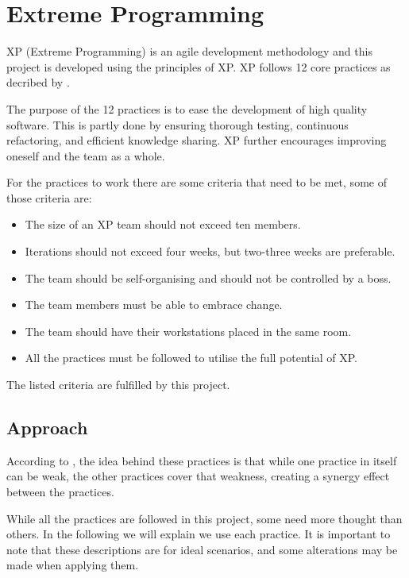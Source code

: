 \section{Extreme Programming}
XP (Extreme Programming) is an agile development methodology and this project is developed using the principles of XP. XP follows 12 core practices as decribed by \citet[p. 54]{xp:explained}.

The purpose of the 12 practices is to ease the development of high quality software. This is partly done by ensuring thorough testing, continuous refactoring, and efficient knowledge sharing. XP further encourages improving oneself and the team as a whole.

For the practices to work there are some criteria that need to be met, some of those criteria are:
\begin{itemize}
\item The size of an XP team should not exceed ten members.
\item Iterations should not exceed four weeks, but two-three weeks are preferable.
\item The team should be self-organising and should not be controlled by a boss.
\item The team members must be able to embrace change.
\item The team should have their workstations placed in the same room.
\item All the practices must be followed to utilise the full potential of XP.

\end{itemize}

The listed criteria are fulfilled by this project. 


\subsection{Approach}
According to \citet[p. 53]{xp:explained}, the idea behind these practices is that while one practice in itself can be weak, the other practices cover that weakness, creating a synergy effect between the practices.

While all the practices are followed in this project, some need more thought than others. In the following we will explain we use each practice. It is important to note that these descriptions are for ideal scenarios, and some alterations may be made when applying them. 

